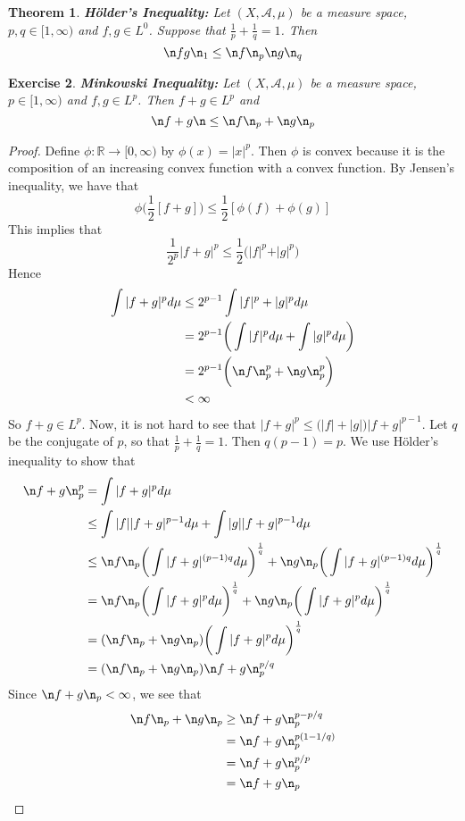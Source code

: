 \documentclass[12pt]{amsart}
\newtheorem{thm}{Theorem}[subsection]
\newtheorem{ex}[thm]{Exercise}
\newcommand{\R}{\mathbb{R}}
\newcommand{\MA}{\mathcal{A}}
\newcommand{\Rg}{[0,\infty)}
\begin{document}
\begin{thm}{\textbf{Hölder's Inequality:}}
	Let $(X, \MA, \mu)$ be a measure space, $p,q \in [1, \infty)$ and $f,g \in L^0$. Suppose that $\frac{1}{p} + \frac{1}{q} = 1$. Then $$\n fg\n_1 \leq \n f \n_p \n g \n_q$$
\end{thm}

\begin{ex}\textbf{Minkowski Inequality:}
	Let $(X, \MA, \mu)$ be a measure space, $p \in [1, \infty)$ and $f,g \in L^p$. Then $f+g \in L^p$ and $$\n f+g\n \leq \n f\n_p + \n g\n_p $$
\end{ex}

\begin{proof}
	Define $\phi:\R \rightarrow \Rg$ by $\phi(x) = \vert x \vert^p$. Then $\phi$ is convex because it is the composition of an increasing convex function with a convex function. By Jensen's inequality, we have that $$\phi\bigg(\frac{1}{2}[f+g] \bigg) \leq \frac{1}{2}[\phi(f)+\phi(g)]$$ 
	This implies that $$\frac{1}{2^p} \vert f+g\vert^p \leq \frac{1}{2}\bigg(\vert f\vert^p +\vert g \vert^p\bigg)$$ 
	Hence 
	\begin{align*}
		\int\vert f + g\vert^p d \mu 
		& \leq 2^{p-1}\int \vert f\vert^p +\vert g\vert^p d\mu \\
		& = 2^{p-1}\bigg(\int \vert f\vert^p d\mu + \int \vert g\vert^p d\mu \bigg) \\
		&= 2^{p-1}\bigg( \n f \n_p^p + \n g \n_p^p\bigg) \\
		& < \infty
	\end{align*}
	So $f+g \in L^p$. Now, it is not hard to see that $|f+g|^p \leq \big( |f| + |g| \big)|f+g|^{p-1}$. Let $q$ be the conjugate of $p$, so that $\frac{1}{p} + \frac{1}{q} = 1$. Then $q(p-1) = p$. We use Hölder's inequality to show that 
	\begin{align*}
		\n f+g \n_p ^p
		&= \int  |f+g|^p d \mu \\
		& \leq \int |f| |f+g|^{p-1} d \mu + \int |g| |f+g|^{p-1} d \mu \\
		& \leq \n f\n_p \bigg(\int |f+g|^{(p-1)q} d\mu\bigg)^{\frac{1}{q}} + \n g\n_p \bigg(\int |f+g|^{(p-1)q}d\mu\bigg)^{\frac{1}{q}} \\
		&= \n f\n_p \bigg(\int |f+g|^{p} d\mu\bigg)^{\frac{1}{q}} + \n g\n_p \bigg(\int |f+g|^{p}d\mu\bigg)^{\frac{1}{q}} \\ 
		&= (\n f\n_p + \n g \n_p) \bigg(\int |f+g|^{p} d\mu\bigg)^{\frac{1}{q}}\\
		&= (\n f \n_p + \n g \n_p) \n f+g \n_p^{p/q}
	\end{align*}
	Since $\n f+g \n_p < \infty$, we see that
	\begin{align*}
		\n f \n_p + \n g \n_p 
		& \geq \n f+g \n_p ^{p - p/q} \\
		&=  \n f+g \n_p ^{p(1 - 1/q)} \\
		&= \n f+g \n_p ^{p/p} \\
		&= \n f+g \n_p
	\end{align*}
\end{proof}
\end{document}
